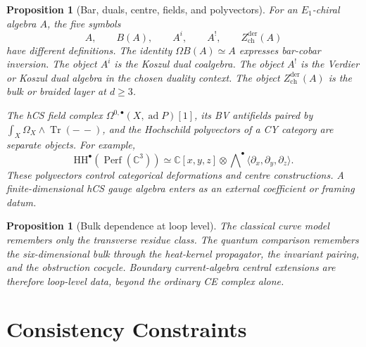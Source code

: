 \documentclass[11pt]{amsart}
\providecommand{\C}{\mathbb{C}}
\providecommand{\HH}{\mathrm{HH}}
\providecommand{\Zchder}{Z^{\mathrm{der}}_{\mathrm{ch}}}
\theoremstyle{plain}
\newtheorem{proposition}[theorem]{Proposition}
\theoremstyle{definition}
\theoremstyle{remark}
\begin{document}
\begin{proposition}[Bar, duals, centre, fields, and polyvectors]
\label{prop:five-objects-separation}
For an \(E_1\)-chiral algebra \(A\), the five symbols
\[
  A,\qquad B(A),\qquad A^i,\qquad A^!,\qquad \Zchder(A)
\]
have different definitions.  The identity \(\Omega B(A)\simeq A\)
expresses bar-cobar inversion.  The object \(A^i\) is the Koszul dual
coalgebra.  The object \(A^!\) is the Verdier or Koszul dual algebra in
the chosen duality context.  The object \(\Zchder(A)\) is the bulk or
braided layer at \(d\geq3\).

The hCS field complex
\(\Omega^{0,\bullet}(X,\operatorname{ad}P)[1]\), its BV antifields
paired by \(\int_X\Omega_X\wedge\operatorname{Tr}(-\, -)\), and the
Hochschild polyvectors of a CY category are separate objects.  For
example,
\[
  \HH^\bullet(\operatorname{Perf}(\C^3))
  \simeq
  \C[x,y,z]\otimes
  \bigwedge\nolimits^\bullet
  \langle\partial_x,\partial_y,\partial_z\rangle .
\]
These polyvectors control categorical deformations and centre
constructions.  A finite-dimensional hCS gauge algebra enters as an
external coefficient or framing datum.
\end{proposition}

\begin{proposition}[Bulk dependence at loop level]
\label{prop:bulk-loop}
The classical curve model remembers only the transverse residue class.
The quantum comparison remembers the six-dimensional bulk through the
heat-kernel propagator, the invariant pairing, and the obstruction
cocycle.  Boundary current-algebra central extensions are therefore
loop-level data, beyond the ordinary CE complex alone.
\end{proposition}

\section{Consistency Constraints}
\label{sec:cross}
\end{document}
